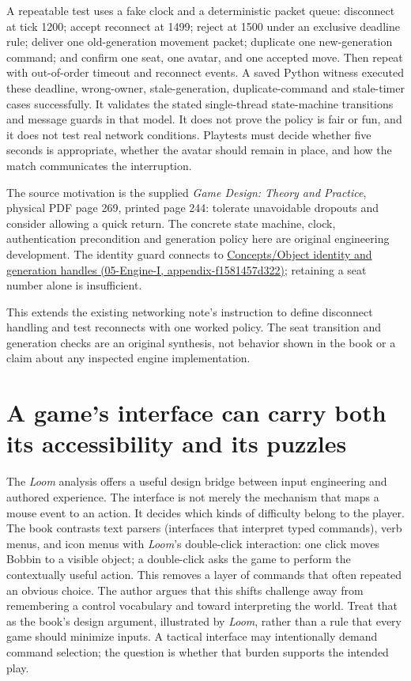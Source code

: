 A repeatable test uses a fake clock and a deterministic packet queue: disconnect at tick 1200; accept reconnect at 1499; reject at 1500 under an exclusive deadline rule; deliver one old-generation movement packet; duplicate one new-generation command; and confirm one seat, one avatar, and one accepted move. Then repeat with out-of-order timeout and reconnect events. A saved Python witness executed these deadline, wrong-owner, stale-generation, duplicate-command and stale-timer cases successfully. It validates the stated single-thread state-machine transitions and message guards in that model. It does not prove the policy is fair or fun, and it does not test real network conditions. Playtests must decide whether five seconds is appropriate, whether the avatar should remain in place, and how the match communicates the interruption.

The source motivation is the supplied \emph{Game Design: Theory and Practice}, physical PDF page 269, printed page 244: tolerate unavoidable dropouts and consider allowing a quick return. The concrete state machine, clock, authentication precondition and generation policy here are original engineering development. The identity guard connects to \href{../05-Engine-I/main.pdf\#nameddest=appendix-f1581457d322}{Concepts/Object identity and generation handles (05-Engine-I, appendix-f1581457d322)}; retaining a seat number alone is insufficient.

This extends the existing networking note's instruction to define disconnect handling and test reconnects with one worked policy. The seat transition and generation checks are an original synthesis, not behavior shown in the book or a claim about any inspected engine implementation.

\section{A game's interface can carry both its accessibility and its puzzles}\label{06-engine-ii-ch047-a-games-interface-can-carry-both-its-accessibility-and-its-puzzles}

The \emph{Loom} analysis offers a useful design bridge between input engineering and authored experience. The interface is not merely the mechanism that maps a mouse event to an action. It decides which kinds of difficulty belong to the player. The book contrasts text parsers (interfaces that interpret typed commands), verb menus, and icon menus with \emph{Loom}'s double-click interaction: one click moves Bobbin to a visible object; a double-click asks the game to perform the contextually useful action. This removes a layer of commands that often repeated an obvious choice. The author argues that this shifts challenge away from remembering a control vocabulary and toward interpreting the world. Treat that as the book's design argument, illustrated by \emph{Loom}, rather than a rule that every game should minimize inputs. A tactical interface may intentionally demand command selection; the question is whether that burden supports the intended play.

